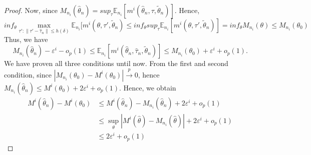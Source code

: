 \documentclass{article}
\theoremstyle{definition}
\begin{document}
\begin{proof}
Now, since $M_{n_i}(\hat\theta_{n})= sup_{\tau}  \mathbb{E}_{n_i}[m^i(\hat\theta_{n},\tau,\tilde\theta_{n})]$. Hence,
\begin{equation*}
inf_{\theta} {\max_{{\tau\prime : \|\tau\prime-\hat\tau_{n}\|\leq h(\delta)}} \mathbb{E}_{n_i}[m^i(\theta,\tau\prime,\tilde\theta_{n})}\leq inf_{\theta} sup_{\tau} \mathbb{E}_{n_i}[m^i(\theta,\tau\prime,\tilde\theta_{n})]=inf_{\theta} M_{n_i}(\theta)\leq M_{n_i}(\theta_0)
\end{equation*}
Thus, we have
  \begin{equation*}
    M_{n_i}(\hat\theta_{n})-\varepsilon^i - o_p(1)\leq  \mathbb{E}_{n_i}[m^i(\hat\theta_n,\hat\tau_n,\tilde\theta_{n})]\leq M_{n_i}(\theta_0)+\varepsilon^i +o_p(1).
     \end{equation*}
We have proven all three conditions until now.
From the first and second condition, since $|M_{n_i}(\theta_0)-M^i(\theta_0)|\xrightarrow{p} 0$, hence $ M_{n_i}(\hat\theta_{n})\leq M^i(\theta_0)+2\varepsilon^i + o_p(1)$.
Hence, we obtain
\begin{align*}
M^i(\hat\theta_{n})-M^i(\theta_0)&\leq M^i(\hat\theta_{n})-M_{n_i}(\hat\theta_{n})+2\varepsilon^i + o_p(1)\\
&\leq \sup_{\theta}|M^i(\hat\theta)-M_{n_i}(\hat\theta)|+2\varepsilon^i + o_p(1)\\
& \leq 2\varepsilon^i+ o_p(1)
\end{align*}


\end{proof}
\end{document}
